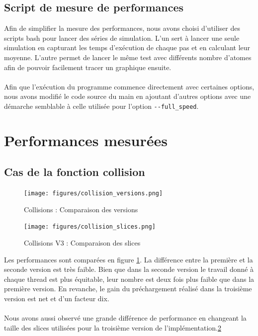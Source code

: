 \documentclass{article}
\begin{document}
\subsection{Script de mesure de performances}
Afin de simplifier la mesure des performances, nous avons choisi d'utiliser des
scripts bash pour lancer des séries de simulation. L'un sert à lancer une seule
simulation en capturant les temps d'exécution de chaque pas et en calculant leur
moyenne. L'autre permet de lancer le même test avec différents nombre d'atomes
afin de pouvoir facilement tracer un graphique ensuite.
\paragraph{}
Afin que l'exécution du programme commence directement avec certaines options,
nous avons modifié le code source du main en ajoutant d'autres options avec une
démarche semblable à celle utilisée pour l'option \verb!--full_speed!.

\section{Performances mesurées}

\subsection{Cas de la fonction collision}
\begin{figure}[ht]
	\caption{Collisions : Comparaison des versions}
	\label{collisions-versions}
	\texttt{[image: figures/collision\_versions.png]}
\end{figure}
\begin{figure}[ht]
	\caption{Collisions V3 : Comparaison des slices}
	\label{collisions-slices}
	\texttt{[image: figures/collision\_slices.png]}
\end{figure}

Les performances sont comparées en figure \ref{collisions-versions}. La différence entre la première et la seconde version est très faible. Bien
que dans la seconde version le travail donné à chaque thread est plus
équitable, leur nombre est deux fois plus faible que dans la première version.
En revanche, le gain du préchargement réalisé dans la troisième version est
net et d'un facteur dix.
\paragraph{}
Nous avons aussi observé une grande différence de performance en
changeant la taille des slices utilisées pour la troisième version
de l'implémentation.\ref{collisions-slices}
\end{document}
